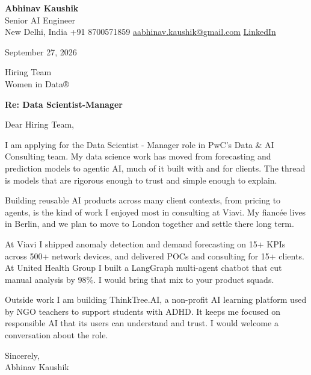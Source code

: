 \documentclass[11pt,a4paper]{article}
\begin{document}
{\Large\bfseries Abhinav Kaushik}\\
Senior AI Engineer\\
New Delhi, India \textbar{} +91 8700571859 \textbar{} \href{mailto:aabhinav.kaushik@gmail.com}{aabhinav.kaushik@gmail.com} \textbar{} \href{https://www.linkedin.com/in/abhinav-kaushik10/}{LinkedIn}  

September 27, 2026

Hiring Team\\
Women in Data®

\textbf{Re: Data Scientist-Manager}

Dear Hiring Team,

I am applying for the Data Scientist - Manager role in PwC's Data \& AI Consulting team. My data science work has moved from forecasting and prediction models to agentic AI, much of it built with and for clients. The thread is models that are rigorous enough to trust and simple enough to explain.

Building reusable AI products across many client contexts, from pricing to agents, is the kind of work I enjoyed most in consulting at Viavi. My fiancée lives in Berlin, and we plan to move to London together and settle there long term.

At Viavi I shipped anomaly detection and demand forecasting on 15+ KPIs across 500+ network devices, and delivered POCs and consulting for 15+ clients. At United Health Group I built a LangGraph multi-agent chatbot that cut manual analysis by 98\%. I would bring that mix to your product squads.

Outside work I am building ThinkTree.AI, a non-profit AI learning platform used by NGO teachers to support students with ADHD. It keeps me focused on responsible AI that its users can understand and trust. I would welcome a conversation about the role.

Sincerely,\\[4pt]
Abhinav Kaushik
\end{document}
